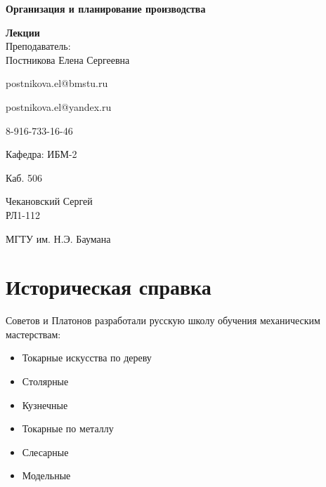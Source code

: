 \documentclass[14pt,a4paper,oneside]{extarticle}
\begin{document}


\begin{titlepage}
    \begin{center}
        \vspace*{1cm}

        \Huge
        \textbf{Организация и планирование производства}
        \vspace{1.5cm}

        \vfill
        \Huge
        \textbf{Лекции}\\
        \vspace{0.5cm}
        \LARGE
        Преподаватель:\\Постникова Елена Сергеевна

        postnikova.el@bmstu.ru

        postnikova.el@yandex.ru

        8-916-733-16-46


        \vspace{1.5cm}

        Кафедра: ИБМ-2

        Каб. 506

        \vfill

        \LARGE
        Чекановский Сергей\\
        РЛ1-112

        \vspace{0.8cm}


        \Large
        МГТУ им. Н.Э. Баумана

    \end{center}
\end{titlepage}

\tableofcontents

\clearpage


\section{Историческая справка}

Советов и Платонов разработали русскую школу обучения механическим мастерствам:

\begin{itemize}
    \item Токарные искусства по дереву
    \item Столярные
    \item Кузнечные
    \item Токарные по металлу
    \item Слесарные
    \item Модельные
\end{itemize}
\end{document}
